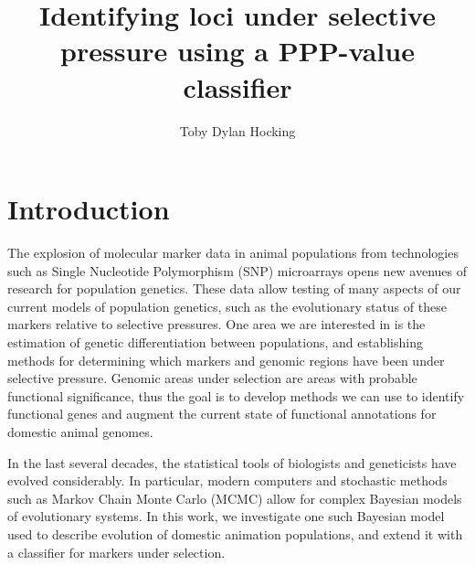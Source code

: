 \documentclass[a4paper,12pt]{article}
\title{Identifying loci under selective pressure using a PPP-value classifier}
\author{Toby Dylan Hocking}
\begin{document}
\maketitle

\newcommand{\fig}[3][1]{
  \begin{figure}[htp]
    \begin{center}          %
    \texttt{[image: \#2]}
    \end{center}
    \caption{#3\label{#2}}
  \end{figure}
}
\newcommand{\brat}[2]{
  \left[
    \begin{array}{#1}
      #2
    \end{array}
    \right]
}
\newcommand{\neff}{\text{popsize}}
\newcommand{\aij}{\alpha_{ij}(t)}
\newcommand{\aijs}{\alpha_{ij}^*(t)}
\newcommand{\wij}[1]{w_{ij}^{\text{#1}}}
\newcommand{\etal}{\emph{et al.}}
\newcommand{\RR}{\mathbb R}
\newcommand{\Bin}{\operatorname{Binomial}}

\section{Introduction}

The explosion of molecular marker data in animal populations from
technologies such as Single Nucleotide Polymorphism (SNP) microarrays
opens new avenues of research for population genetics. These data
allow testing of many aspects of our current models of population
genetics, such as the evolutionary status of these markers relative to
selective pressures. One area we are interested in is the estimation
of genetic differentiation between populations, and establishing
methods for determining which markers and genomic regions have been
under selective pressure. Genomic areas under selection are areas with
probable functional significance, thus the goal is to develop methods
we can use to identify functional genes and augment the current state
of functional annotations for domestic animal genomes.

In the last several decades, the statistical tools of biologists and
geneticists have evolved considerably. In particular, modern computers
and stochastic methods such as Markov Chain Monte Carlo (MCMC) allow
for complex Bayesian models of evolutionary systems. In this work, we
investigate one such Bayesian model used to describe evolution of
domestic animation populations, and extend it with a classifier for
markers under selection.
\end{document}
